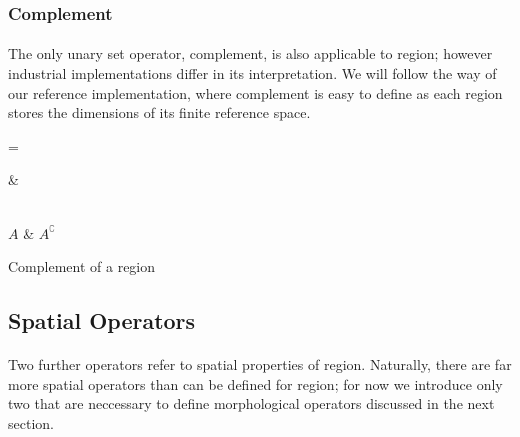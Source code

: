 \subsubsection{Complement}

\paragraph*{}
The only unary set operator, complement, is also applicable to region; however industrial implementations differ in its interpretation. We will follow the way of our reference implementation, where complement is easy to define as each region stores the dimensions of its finite reference space.

\newarray\complementInput
{}

\newarray\complementResult
{}

\dataheight=\gridwidth

\begin{table}[h!]
\centering
{}

 &

\\

$A$ &
$A^{\complement}$

\endtabular
\caption{Complement of a region}
\label{tab:RegionComplement}
\end{table}


\subsection{Spatial Operators}

\paragraph*{} 
Two further operators refer to spatial properties of region. Naturally, there are far more spatial operators than can be defined for region; for now we introduce only two that are neccessary to define morphological operators discussed in the next section.

